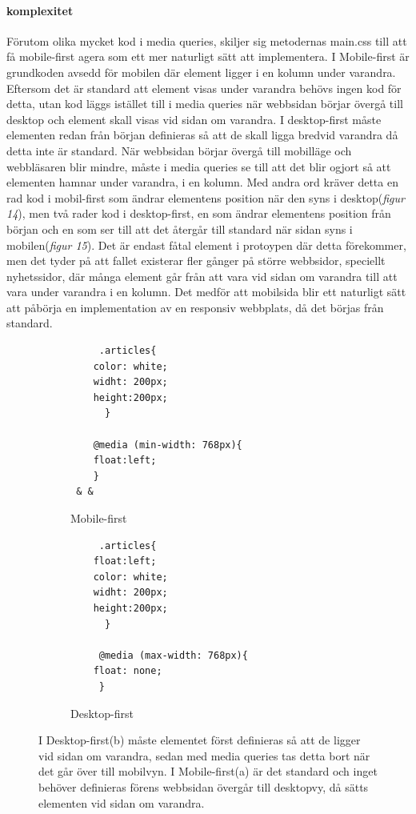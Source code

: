 \documentclass[11pt]{article}
\begin{document}
\paragraph{komplexitet}\mbox{}

Förutom olika mycket kod i media queries, skiljer sig metodernas main.css till att få mobile-first agera som ett mer naturligt sätt att implementera. I Mobile-first är grundkoden avsedd för mobilen där element ligger i en kolumn under varandra. Eftersom det är standard att element visas under varandra behövs ingen kod för detta, utan kod läggs istället till i media queries när webbsidan börjar övergå till desktop och element skall visas vid sidan om varandra. I desktop-first måste elementen redan från början definieras så att de skall ligga bredvid varandra då detta inte är standard. När webbsidan börjar övergå till mobilläge och webbläsaren blir mindre, måste i media queries se till att det blir ogjort så att elementen hamnar under varandra, i en kolumn. Med andra ord kräver detta en rad kod i mobil-first som ändrar elementens position när den syns i desktop(\textit{figur 14}), men två rader kod i desktop-first, en som ändrar elementens position från början och en som ser till att det återgår till standard när sidan syns i mobilen(\textit{figur 15}). Det är endast fåtal element i protoypen där detta förekommer, men det tyder på att fallet existerar fler gånger på större webbsidor, speciellt nyhetssidor, där många element går från att vara vid sidan om varandra till att vara under varandra i en kolumn. Det medför att mobilsida blir ett naturligt sätt att påbörja en implementation av en responsiv webbplats, då det börjas från standard. 

\setcounter{figure}{13}
\begin{figure}[H]
  \begin{subfigure}[b]{.5\linewidth }

    \begin{lstlisting}
     .articles{
	color: white;
	widht: 200px;
	height:200px;
      }

    @media (min-width: 768px){
	float:left;
    }
 & &
    \end{lstlisting}
    \caption{Mobile-first}
    \end{subfigure}
    \begin{subfigure}[b]{.5\linewidth}
	\begin{lstlisting}
     .articles{
	float:left;
	color: white;
	widht: 200px;
	height:200px;
      }

     @media (max-width: 768px){
	float: none;  
     }
	\end{lstlisting}
    \caption{Desktop-first}
  \end{subfigure}
  \caption{I Desktop-first(b) måste elementet först definieras så att de ligger vid sidan om varandra, sedan med media queries tas detta bort när det går över till mobilvyn. I Mobile-first(a) är det standard och inget behöver definieras förens webbsidan övergår till desktopvy, då sätts elementen vid sidan om varandra.}
\end{figure}
\newpage
\end{document}
